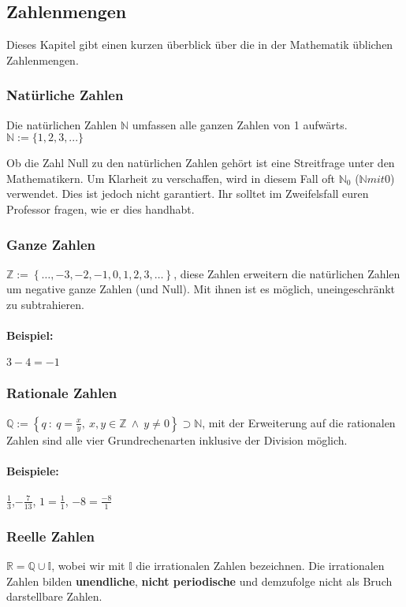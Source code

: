 \subsection{Zahlenmengen}
Dieses Kapitel gibt einen kurzen überblick über die in der Mathematik üblichen Zahlenmengen.

\subsubsection{Natürliche Zahlen}
Die natürlichen Zahlen $\mathbb{N}$ umfassen alle ganzen Zahlen von 1 aufwärts.\\
$\mathbb{N} := \{1, 2, 3, ...\}$
\begin{warning}
	Ob die Zahl Null zu den natürlichen Zahlen gehört ist eine Streitfrage unter den Mathematikern. Um Klarheit zu verschaffen, wird in diesem Fall oft $\mathbb{N}_0$ ($\mathbb{N} mit 0$) verwendet. Dies ist jedoch nicht garantiert. Ihr solltet im Zweifelsfall euren Professor fragen, wie er dies handhabt.
\end{warning}

\subsubsection{Ganze Zahlen}
$\mathbb{Z} := \left\{\ldots, -3, -2, -1, 0, 1, 2, 3, \ldots \right\}$, diese Zahlen erweitern die natürlichen Zahlen um negative ganze Zahlen (und Null). Mit ihnen ist es möglich, uneingeschränkt zu subtrahieren.
\paragraph{Beispiel: } $3 - 4 = -1$

\subsubsection{Rationale Zahlen}
$\mathbb{Q} := \left\{ q \  : \ q = \frac{x}{y}, \ x,y \in \mathbb{Z} \  \land \ y \neq 0 \right\} \supset \mathbb{N}$, mit der Erweiterung auf die rationalen Zahlen sind alle vier Grundrechenarten inklusive der Division möglich.

\paragraph{Beispiele: } $\frac{1}{3}$,$-\frac{7}{13}$, $1 = \frac{1}{1}$, $-8 =\frac{-8}{1}$

\subsubsection{Reelle Zahlen}
$\mathbb{R} = \mathbb{Q} \cup \mathbb{I}$, wobei wir mit $\mathbb{I}$ die irrationalen Zahlen bezeichnen. Die irrationalen Zahlen bilden \textbf{unendliche}, \textbf{nicht periodische} und demzufolge nicht als Bruch darstellbare Zahlen.

